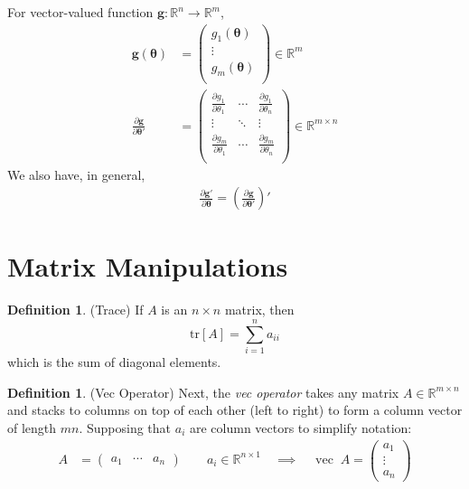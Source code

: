 \documentclass[12pt]{article}
\theoremstyle{plain}
\theoremstyle{definition}
\newtheorem{defn}[thm]{Definition}
\theoremstyle{remark}
\newcommand{\bsg}{\boldsymbol{g}}
\newcommand{\bstheta}{\boldsymbol{\theta}}
\newcommand{\Rmn}{\mathbb{R}^{m\times n}}
\newcommand{\vc}{\operatorname{vec}}
\begin{document}
For vector-valued function $\bsg:
\mathbb{R}^n\rightarrow\mathbb{R}^m$,
\begin{align*}
  \bsg(\bstheta)
  &=
  \begin{pmatrix}
    g_1(\bstheta) \\
    \vdots \\
    g_m(\bstheta) \\
  \end{pmatrix}\in \mathbb{R}^m\\
  \frac{\partial \bsg}{\partial \boldsymbol{\theta'}}
  &=
  \begin{pmatrix}
    \frac{\partial g_1}{\partial \theta_1}
      & \cdots & \frac{\partial g_1}{\partial \theta_n}\\
    \vdots & \ddots & \vdots\\
    \frac{\partial g_m}{\partial \theta_1}
      & \cdots & \frac{\partial g_m}{\partial \theta_n}\\
  \end{pmatrix}
  \in \mathbb{R}^{m\times n}
\end{align*}
We also have, in general,
\begin{align*}
  \frac{\partial\boldsymbol{g'}}{\partial \bstheta}
  =
  \left(
  \frac{\partial\bsg}{\partial \boldsymbol{\theta'}}
  \right)'
\end{align*}

\clearpage
\section{Matrix Manipulations}

\begin{defn}(Trace)
If $A$ is an $n\times n$ matrix, then
\begin{equation}
    \text{tr}[A] = \sum^n_{i=1} a_{ii}
\end{equation}
which is the sum of diagonal elements.
\end{defn}

\begin{defn}(Vec Operator)
Next, the \emph{vec operator} takes any matrix $A\in\Rmn$
and stacks to columns on top of each other (left to right) to form a
column vector of length $mn$.  Supposing that $a_i$ are column vectors
to simplify notation:
\begin{align*}
  A &= \begin{pmatrix} a_1 & \cdots & a_n \end{pmatrix}
	\qquad a_i \in \mathbb{R}^{n\times 1}
  \quad\implies\quad
  \vc\; A =
	\begin{pmatrix} a_1 \\ \vdots \\ a_n \end{pmatrix}
\end{align*}
\end{defn}
\end{document}
